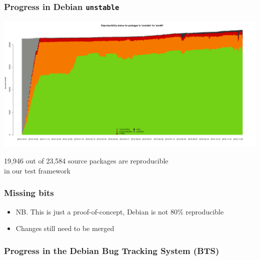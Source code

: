 \documentclass[14pt]{beamer}
\begin{document}
\begin{frame}
 \frametitle{Progress in Debian \texttt{unstable}}
 \begin{center}
  \includegraphics[height=0.73\paperheight]{images/stats_pkg_state.png}

  \footnotesize{19,946 out of 23,584 source packages are reproducible \\
    in our test framework}
  \vfill
 \end{center}
\end{frame}

\begin{frame}
 \frametitle{Missing bits}
 \begin{itemize}
  \item NB. This is just a proof-of-concept, Debian is not 80\%
  reproducible
  \item Changes still need to be merged
 \end{itemize}
\end{frame}

\begin{frame}
 \frametitle{Progress in the Debian Bug Tracking System (BTS)}
\end{frame}
\end{document}
